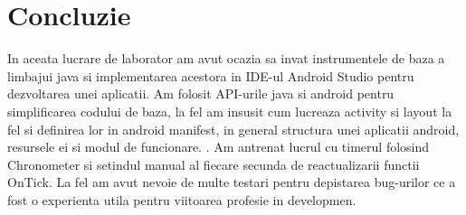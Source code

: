 \section*{Concluzie}


In aceata lucrare de laborator am avut ocazia sa invat instrumentele de baza a limbajui java si implementarea acestora in IDE-ul Android Studio pentru dezvoltarea unei aplicatii. Am folosit API-urile java si android pentru simplificarea codului de baza, la fel am insusit cum lucreaza activity si layout la fel si definirea lor in android manifest, in general structura unei aplicatii android, resursele ei si modul de funcionare. . Am antrenat lucrul cu timerul folosind Chronometer si setindul manual al fiecare secunda de reactualizarii functii OnTick. La fel am avut nevoie de multe testari pentru depistarea bug-urilor ce a fost o experienta utila pentru viitoarea profesie in developmen.

\clearpage